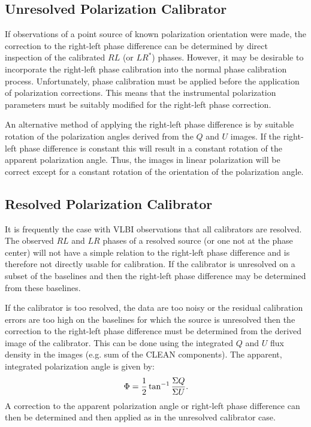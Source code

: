 \subsection{Unresolved Polarization Calibrator}

   If observations of a point source of known polarization
orientation were made, the correction to the right-left phase
difference can be determined by direct inspection of the calibrated
$RL$ (or $LR^*$) phases.  However, it may be desirable to incorporate
the right-left phase calibration into the normal phase calibration
process.  Unfortunately, phase calibration must be applied before the
application of polarization corrections.  This means that the
instrumental polarization parameters must be suitably modified for the
right-left phase correction.

   An alternative method of applying the right-left phase difference
is by suitable rotation of the polarization angles derived from the
$Q$ and $U$ images.  If the right-left phase difference is constant
this will result in a constant rotation of the apparent polarization
angle.  Thus,  the images in linear polarization will be correct except
for a constant rotation of the orientation of the polarization angle.

\subsection{Resolved Polarization Calibrator}

   It is frequently the case with VLBI observations that all
calibrators are resolved.  The observed $RL$ and $LR$ phases of a
resolved source (or one not at the phase center) will not have a
simple relation to the right-left phase difference and is therefore
not directly usable for calibration.  If the calibrator is unresolved
on a subset of the baselines and then the right-left phase difference
may be determined from these baselines.

   If the calibrator is too resolved, the data are too noisy or the
residual calibration errors are too high on the baselines for which
the source is unresolved then the correction to the right-left phase
difference must be determined from the derived image of the
calibrator.  This can be done using the integrated $Q$ and $U$ flux
density in the images (e.g. sum of the CLEAN components).  The
apparent, integrated polarization angle is given by:
$$\Phi = {1\over{2}} \tan^{-1} {\Sigma Q\over{\Sigma U}}.$$
A correction to the apparent polarization angle or right-left phase
difference can then be determined and then applied as in the unresolved
calibrator case.


